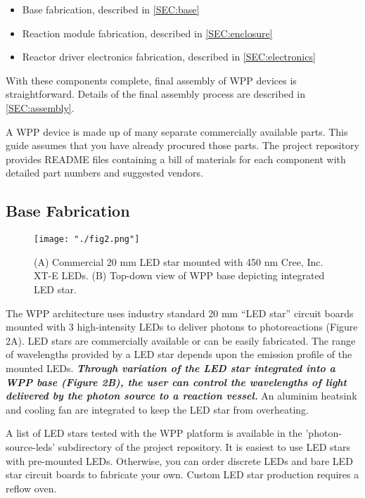 \documentclass[11pt]{article}
\begin{document}
\begin{itemize}
	\item Base fabrication, described in \autoref{SEC:base}
	\item Reaction module fabrication, described in \autoref{SEC:enclosure}
	\item Reactor driver electronics fabrication, described in \autoref{SEC:electronics}
\end{itemize}

With these components complete, final assembly of WPP devices is straightforward.
Details of the final assembly process are described in \autoref{SEC:assembly}.

A WPP device is made up of many separate commercially available parts.
This guide assumes that you have already procured those parts.
The project repository provides README files containing a bill of materials for each component with detailed part numbers and suggested vendors.

\subsection{Base Fabrication} \label{SEC:base}

\begin{figure}[H]
	\texttt{[image: "./fig2.png"]}
	\caption{(A) Commercial 20 mm LED star mounted with 450 nm Cree, Inc. XT-E LEDs. (B) Top-down view of WPP base depicting integrated LED star.}
\end{figure}

The WPP architecture uses industry standard 20 mm ``LED star'' circuit boards mounted with 3 high-intensity LEDs to deliver photons to photoreactions (Figure 2A).
LED stars are commercially available or can be easily fabricated.
The range of wavelengths provided by a LED star depends upon the emission profile of the mounted LEDs.
\textbf{\textit{Through variation of the LED star integrated into a WPP base (Figure 2B), the user can control the wavelengths of light delivered by the photon source to a reaction vessel.}}
An aluminim heatsink and cooling fan are integrated to keep the LED star from overheating.

A list of LED stars tested with the WPP platform is available in the 'photon-source-leds' subdirectory of the project repository.
It is easiest to use LED stars with pre-mounted LEDs.
Otherwise, you can order discrete LEDs and bare LED star circuit boards to fabricate your own.
Custom LED star production requires a reflow oven.
\end{document}
